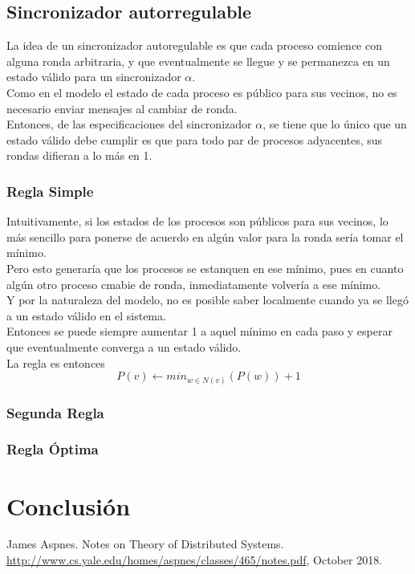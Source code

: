 \documentclass[12pt,a4paper]{article}
\begin{document}
{    \subsection{Sincronizador autorregulable}{
        La idea de un sincronizador autoregulable es que cada proceso comience
        con alguna ronda arbitraria, y que eventualmente se llegue y se
        permanezca en un estado válido para un sincronizador $\alpha$.\\
        Como en el modelo el estado de cada proceso es público para sus vecinos,
        no es necesario enviar mensajes al cambiar de ronda.\\
        Entonces, de las especificaciones del sincronizador $\alpha$, se tiene
        que lo único que un estado válido debe cumplir es que para todo par de
        procesos adyacentes, sus rondas difieran a lo más en 1.
    }

        \subsubsection{Regla Simple}{
        Intuitivamente, si los estados de los procesos son públicos para sus
        vecinos, lo más sencillo para ponerse de acuerdo en algún valor para la
        ronda sería tomar el mínimo.\\
        Pero esto generaría que los procesos se estanquen en ese mínimo, pues en
        cuanto algún otro proceso cmabie de ronda, inmediatamente volvería a ese
        mínimo.\\
        Y por la naturaleza del modelo, no es posible saber localmente cuando ya
        se llegó a un estado válido en el sistema.\\
        Entonces se puede siempre aumentar 1 a aquel mínimo en cada paso y
        esperar que eventualmente converga a un estado válido.\\
        La regla es entonces
        \[P(v) \leftarrow min_{w \in N(v)}(P(w)) + 1\]
        }

        \subsubsection{Segunda Regla}{}

        \subsubsection{Regla Óptima}{}
}
\section{Conclusión}{}

\begin{thebibliography}{}

James Aspnes. Notes on Theory of Distributed Systems.
\href{http://www.cs.yale.edu/homes/aspnes/classes/465/notes.pdf}
{http://www.cs.yale.edu/homes/aspnes/classes/465/notes.pdf}, October 2018.

\end{thebibliography}
\end{document}
